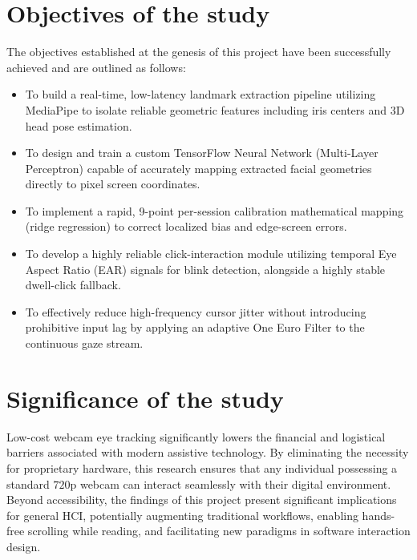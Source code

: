 \documentclass[12pt,a4paper]{report}
\begin{document}
\section{Objectives of the study}
The objectives established at the genesis of this project have been successfully achieved and are outlined as follows:
\begin{itemize}
    \item To build a real-time, low-latency landmark extraction pipeline utilizing MediaPipe to isolate reliable geometric features including iris centers and 3D head pose estimation.
    \item To design and train a custom TensorFlow Neural Network (Multi-Layer Perceptron) capable of accurately mapping extracted facial geometries directly to pixel screen coordinates.
    \item To implement a rapid, 9-point per-session calibration mathematical mapping (ridge regression) to correct localized bias and edge-screen errors.
    \item To develop a highly reliable click-interaction module utilizing temporal Eye Aspect Ratio (EAR) signals for blink detection, alongside a highly stable dwell-click fallback.
    \item To effectively reduce high-frequency cursor jitter without introducing prohibitive input lag by applying an adaptive One Euro Filter to the continuous gaze stream.
\end{itemize}

\section{Significance of the study}
Low-cost webcam eye tracking significantly lowers the financial and logistical barriers associated with modern assistive technology. By eliminating the necessity for proprietary hardware, this research ensures that any individual possessing a standard $720$p webcam can interact seamlessly with their digital environment. Beyond accessibility, the findings of this project present significant implications for general HCI, potentially augmenting traditional workflows, enabling hands-free scrolling while reading, and facilitating new paradigms in software interaction design.
\end{document}
